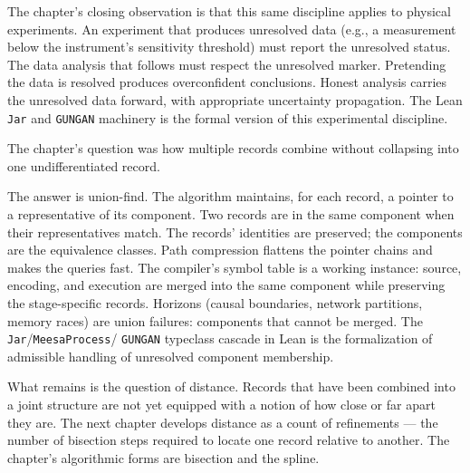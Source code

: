 The chapter's closing observation is that this same discipline
applies to physical experiments. An experiment that produces
unresolved data (e.g., a measurement below the instrument's
sensitivity threshold) must report the unresolved status. The data
analysis that follows must respect the unresolved marker. Pretending
the data is resolved produces overconfident conclusions. Honest
analysis carries the unresolved data forward, with appropriate
uncertainty propagation. The Lean \texttt{Jar} and \texttt{GUNGAN}
machinery is the formal version of this experimental discipline.

\begin{bridge}

The chapter's question was how multiple records combine without
collapsing into one undifferentiated record.

The answer is union-find. The algorithm maintains, for each record, a
pointer to a representative of its component. Two records are in the
same component when their representatives match. The records'
identities are preserved; the components are the equivalence classes.
Path compression flattens the pointer chains and makes the queries
fast. The compiler's symbol table is a working instance: source,
encoding, and execution are merged into the same component while
preserving the stage-specific records. Horizons (causal boundaries,
network partitions, memory races) are union failures: components
that cannot be merged. The \texttt{Jar}/\texttt{MeesaProcess}/
\texttt{GUNGAN} typeclass cascade in Lean is the formalization of
admissible handling of unresolved component membership.

What remains is the question of distance. Records that have been
combined into a joint structure are not yet equipped with a notion of
how close or far apart they are. The next chapter develops distance
as a count of refinements --- the number of bisection steps required
to locate one record relative to another. The chapter's algorithmic
forms are bisection and the spline.

\end{bridge}

